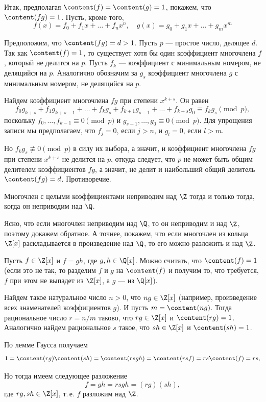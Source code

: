 \begin{enumerate}
Итак, предполагая $\content(f)=\content(g)=1$, покажем, что $\content(fg)=1$. Пусть, кроме того,
$$
f(x) = f_0+f_1x+\dots+f_nx^n,\quad g(x) = g_0+g_1x+\dots+g_mx^m
$$

Предположим, что $\content(fg)=d>1$. Пусть $p$ --- простое число, делящее $d$. Так как $\content(f)=1$, то существует хотя бы один коэффициент многочлена $f$, который не делится на $p$. Пусть $f_k$ --- коэффициент с минимальным номером, не делящийся на $p$.
Аналогично обозначим за $g_s$ коэффициент многочлена $g$ с минимальным номером, не делящийся на $p$.

Найдем коэффициент многочлена $fg$ при степени $x^{k+s}$. Он равен
$$
f_0g_{k+s}+f_1g_{k+s-1}+\dots+f_kg_s+f_{k+1}g_{s-1}+\dots+f_{k+s}g_0\equiv f_kg_s\pmod p,
$$
поскольку
$f_0,\dots,f_{k-1}\equiv 0\pmod p$ и $g_{s-1},\dots,g_0\equiv 0\pmod p$. Для упрощения записи мы предполагаем, что $f_j=0$, если $j>n$, и $g_l=0$, если $l>m$.

Но $f_kg_s\not\equiv 0\pmod p$ в силу их выбора, а значит, и коэффициент многочлена $fg$ при степени $x^{k+s}$ не делится на $p$, откуда следует, что $p$ не может быть общим делителем коэффициентов $fg$, а значит, не делит и наибольший общий делитель $\content(fg)=d$. Противоречие.
\epf
\begin{sled}
Многочлен с целыми коэффициентами неприводим над $\Z$ тогда и только тогда, когда он неприводим над $\Q$.
\end{sled}
\pf
Ясно, что если многочлен неприводим над $\Q$, то он неприводим и над $\Z$, поэтому докажем обратное. А точнее, покажем, что если многочлен из кольца $\Z[x]$ раскладывается в произведение над $\Q$, то его можно разложить и над $\Z$.

Пусть $f\in\Z[x]$ и $f=gh$, где $g,h\in\Q[x]$. Можно считать, что $\content(f)=1$ (если это не так, то разделим $f$ и $g$ на $\content(f)$ и получим то, что требуется, $f$ при этом не выпадет из $\Z[x]$, а $g$ --- из $\Q[x]$).

Найдем такое натуральное число $n>0$, что $ng\in\Z[x]$ (например, произведение всех знаменателей коэффициентов $g$). И пусть $m=\content(ng)$. Тогда рациональное число $r=n/m$ таково, что $rg\in\Z[x]$ и $\content(rg)=1$. Аналогично найдем рациональное $s$ такое, что $sh\in\Z[x]$ и $\content(sh)=1$.

По лемме Гаусса получаем
$$
1=\content(rg)\content(sh)=\content(rsgh)=\content(rsf)=rs\content(f)=rs,
$$

Но тогда имеем следующее разложение
$$
f=gh=rsgh=(rg)(sh),
$$
где $rg,sh\in\Z[x]$, т.\,е. $f$ разложим над $\Z$.
\epf




\end{enumerate}
